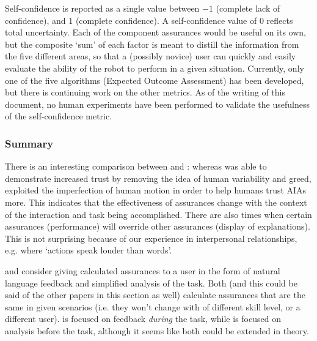 Self-confidence is reported as a single value between $-1$ (complete lack of confidence), and $1$ (complete confidence). A self-confidence value of $0$ reflects total uncertainty. Each of the component assurances would be useful on its own, but the composite `sum' of each factor is meant to distill the information from the five different areas, so that a (possibly novice) user can quickly and easily evaluate the ability of the robot to perform in a given situation. Currently, only one of the five algorithms (Expected Outcome Assessment) has been developed, but there is continuing work on the other metrics. As of the writing of this document, no human experiments have been performed to validate the usefulness of the self-confidence metric. 

\subsubsection{Summary}
There is an interesting comparison between \citet{Wu2016-ei} and \citet{Dragan2013-wd}: whereas \cite{Wu2016-ei} was able to demonstrate increased trust by removing the idea of human variability and greed, \cite{Dragan2013-wd} exploited the imperfection of human motion in order to help humans trust AIAs more. This indicates that the effectiveness of assurances change with the context of the interaction and task being accomplished. There are also times when certain assurances (performance) will override other assurances (display of explanations). This is not surprising because of our experience in interpersonal relationships, e.g. where `actions speak louder than words'. 

\citeauthor{Wang2016-id} and \citeauthor{Aitken2016-fb} consider giving calculated assurances to a user in the form of natural language feedback and simplified analysis of the task. Both (and this could be said of the other papers in this section as well) calculate assurances that are the same in given scenarios (i.e. they won't change with of different skill level, or a different user). \citet{Wang2016-id} is focused on feedback \emph{during} the task, while \citet{Aitken2016-fb} is focused on analysis before the task, although it seems like both could be extended in theory.
